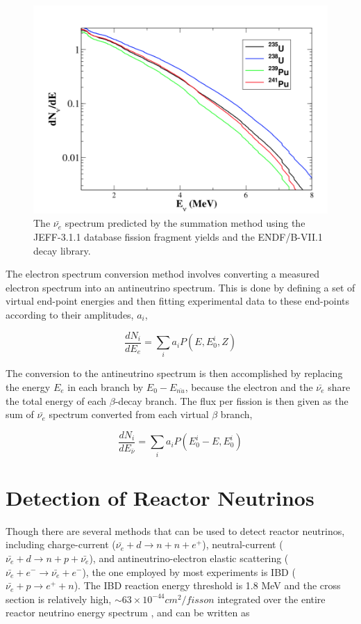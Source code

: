 \begin{figure}[t]
	\centering
	\includegraphics[width=0.7\linewidth]{tex/3-reactorneutrinos-images/Spectrum}
	\caption{The $\bar{\nu_e}$ spectrum predicted by the summation method using the JEFF-3.1.1 database fission fragment yields and the ENDF/B-VII.1 decay library. }
	\label{fig:spectrum}
\end{figure}

The electron spectrum conversion method involves converting a measured electron spectrum into an antineutrino spectrum. 
This is done by defining a set of virtual end-point energies and then fitting experimental data to these end-points according to their amplitudes, $a_i$, 

\begin{equation}
	\frac{dN_i}{dE_e} = \sum_{i}a_iP(E,E^i_0,Z)
\end{equation}

The conversion to the antineutrino spectrum is then accomplished by replacing the energy $E_e$ in each branch by $E_0 - E_{\bar{nu}}$, because the electron and the $\bar{\nu_e}$ share the total energy of each $\beta$-decay branch.
The flux per fission is then given as the sum of $\bar{\nu_e}$ spectrum converted from each virtual $\beta$ branch,

\begin{equation}
	\frac{dN_i}{dE_{\bar{\nu}}} = \sum_{i}a_iP(E^i_0-E,E^i_0)
\end{equation}



\section{Detection of Reactor Neutrinos}

Though there are several methods that can be used to detect reactor neutrinos, including charge-current ($\bar{\nu_e} + d \rightarrow n + n + e^+$), neutral-current ($\bar{\nu_e} + d \rightarrow n + p + \bar{\nu_e}$), and antineutrino-electron elastic scattering ($\bar{\nu_e} + e^- \rightarrow \bar{\nu_e} + e^-$), the one employed by most experiments is IBD ($\bar{\nu_e} + p \rightarrow e^+ + n$).
The IBD reaction energy threshold is 1.8 MeV and the cross section is relatively high, $\sim 63 \times 10^{-44} cm^2/fisson$ integrated over the entire reactor neutrino energy spectrum , and can be written as

